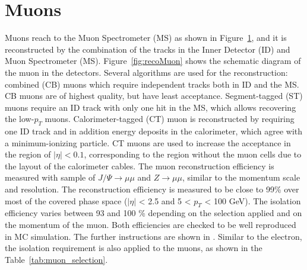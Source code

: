 \section{Muons}
Muons reach to the Muon Spectrometer (MS) as shown in Figure~\ref{}, and it is reconstructed by the combination of the tracks in the Inner Detector (ID) and Muon Spectrometer (MS). 
Figure~\ref{fig:recoMuon} shows the schematic diagram of the muon in the detectors.
Several algorithms are used for the reconstruction: 
combined (CB) muons which require independent tracks both in ID and the MS. CB muons are of highest quality, but have least acceptance. 
Segment-tagged (ST) muons require an ID track with only one hit in the MS, which allows recovering the low-$p_T$ muons. 
Calorimeter-tagged (CT) muon is reconstructed by requiring one ID track and in addition energy deposits in the calorimeter, which agree with a minimum-ionizing particle. CT muons are used to increase the acceptance in the region of $|\eta| < 0.1$, corresponding to the region without the muon cells due to the layout of the calorimeter cables. 
The muon reconstruction efficiency is measured with sample of $J/\Psi \rightarrow \mu\mu$ and $Z\rightarrow \mu\mu$, similar to the momentum scale and resolution.
The reconstruction efficiency is measured to be close to 99\% over most of the covered phase space ($|\eta|$ < 2.5 and 5 < $p_{T}$ < 100 GeV). The isolation efficiency varies between 93 and 100 \% depending on the selection applied and on the momentum of the muon. Both efficiencies are checked to be well reproduced in MC simulation. 
The further instructions are shown in \cite{MUON-2018-03}.
Similar to the electron, the isolation requirement is also applied to the muons, as shown in the Table~\ref{tab:muon_selection}.
